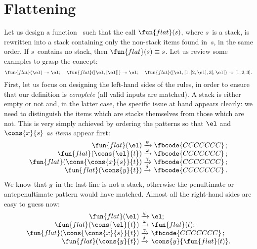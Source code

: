 \section{Flattening}
\label{sec:flattening}

Let us design a function~ such
that the call \(\fun{flat}(s)\), where \(s\)~is a stack, is rewritten
into a stack containing only the non\hyp{}stack items found in~\(s\),
in the same order. If \(s\)~contains no stack, then \(\fun{flat}(s)
\equiv s\). Let us review some
examples to grasp the concept:
\begin{equation*}
\fun{flat}(\el) \twoheadrightarrow \el; \quad
\fun{flat}([\el,[\el]]) \twoheadrightarrow \el;\quad
\fun{flat}([\el,[1,[2,\el],3],\el]) \twoheadrightarrow [1,2,3].
\end{equation*}
First, let us focus on designing the left\hyp{}hand sides of the
rules, in order to ensure that our definition is \emph{complete} (all
valid inputs are matched). A stack is either empty or not and, in the
latter case, the specific issue at hand appears clearly: we need to
distinguish the items which are stacks themselves from those which are
not. This is very simply achieved by ordering the patterns so that
\(\el\) and \(\cons{x}{s}\) \emph{as items} appear
first:
\begin{equation*}
\begin{array}{r@{\;}l@{\;}l}
\fun{flat}(\el)                   & \xrightarrow{\smash{\psi}}   & \fbcode{CCCCCCC}\,;\\
\fun{flat}(\cons{\el}{t})         & \xrightarrow{\smash{\omega}} & \fbcode{CCCCCCC}\,;\\
\fun{flat}(\cons{\cons{x}{s}}{t}) & \xrightarrow{\smash{\gamma}} & \fbcode{CCCCCCC}\,;\\
\fun{flat}(\cons{y}{t})           & \xrightarrow{\smash{\delta}} & \fbcode{CCCCCCC}\,.
\end{array}
\end{equation*}
We know that \(y\)~in the last line is not a stack, otherwise the
penultimate or antepenultimate pattern would have matched. Almost all
the right\hyp{}hand sides are easy to guess now:
\begin{equation*}
\begin{array}{r@{\;}l@{\;}l}
\fun{flat}(\el)                   & \xrightarrow{\smash{\psi}}   & \el;\\
\fun{flat}(\cons{\el}{t})         & \xrightarrow{\smash{\omega}} & \fun{flat}(t);\\
\fun{flat}(\cons{\cons{x}{s}}{t}) & \xrightarrow{\smash{\gamma}} & \fbcode{CCCCCCC}\,;\\
\fun{flat}(\cons{y}{t})           & \xrightarrow{\smash{\delta}} & \cons{y}{\fun{flat}(t)}.
\end{array}
\end{equation*}
